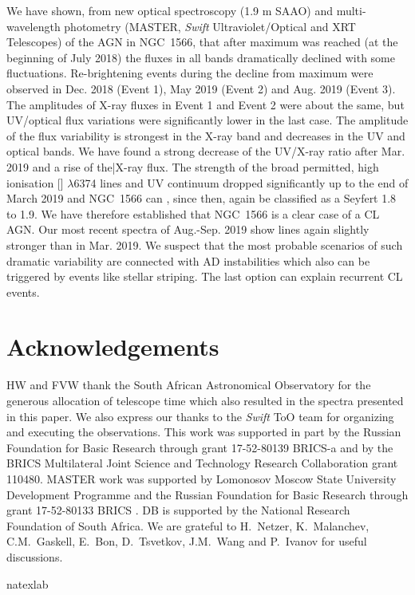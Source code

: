 \documentclass[fleqn,usenatbib]{mnras}
\begin{document}
We have shown, from new  optical spectroscopy (1.9 m SAAO) and multi-wavelength photometry (MASTER, {\it Swift} Ultraviolet/Optical and  XRT Telescopes) of the AGN in NGC~1566, that after maximum was reached (at the beginning of July 2018) the fluxes in all bands dramatically declined with some fluctuations. Re-brightening events during the decline from maximum were observed in Dec. 2018 (Event 1), May 2019 (Event 2) and Aug. 2019 (Event 3). The amplitudes of X-ray fluxes in Event 1 and Event 2 were about the same, but UV/optical flux variations were significantly lower in the last case. The amplitude of the flux variability is strongest in the X-ray band and decreases in the UV and optical bands. We have found a strong decrease of the UV/X-ray ratio after Mar. 2019 and a rise of the|X-ray flux. The strength of the broad permitted, high ionisation [] $\lambda$6374 lines and UV continuum dropped significantly up to the end of March 2019 and NGC~1566 can , since then, again be classified as a Seyfert 1.8 to 1.9. We have therefore established that NGC~1566 is a clear case of a CL AGN.  Our most recent spectra of Aug.-Sep. 2019 show lines again slightly stronger than in Mar. 2019.
We suspect that the most probable scenarios of such dramatic variability are connected with AD instabilities which also can be triggered by events like stellar striping. The last option can explain recurrent CL events.


\section*{Acknowledgements}
HW and FVW thank the South African Astronomical Observatory for the generous allocation of telescope time which also resulted in the spectra presented in this paper. We also express our thanks to the {\it Swift} ToO team for organizing and executing the observations. This work was supported in part by the Russian Foundation for Basic Research through grant 17-52-80139 BRICS-a and by the BRICS Multilateral Joint Science and Technology Research Collaboration grant 110480. MASTER work was supported by Lomonosov Moscow State University Development Programme and  the Russian Foundation for Basic Research through grant 17-52-80133 BRICS . DB is supported by the National Research Foundation of South Africa. We are grateful to H.~Netzer, K.~Malanchev, C.M.~Gaskell, E.~Bon, D.~Tsvetkov, J.M.~Wang  and P.~Ivanov   for useful discussions.




\expandafter\ifx\csname natexlab\endcsname\relax\def\natexlab#1{#1}\fi




\bsp	%

\label{lastpage}
\end{document}
